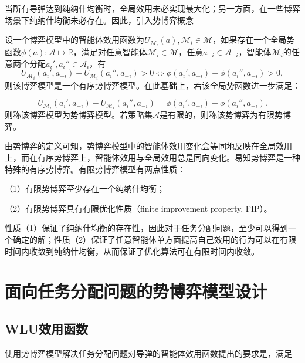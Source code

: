 当所有导弹达到纯纳什均衡时，全局效用未必实现最大化；另一方面，在一些博弈场景下纯纳什均衡未必存在。因此，引入势博弈概念

\begin{definition}[有序势博弈与势博弈]
\label{pg:def:potentialGame}
	设一个博弈模型中的智能体效用函数为$U_{\mathcal{M}_i}(a),\mathcal{M}_i\in \mathcal{M}$，如果存在一个全局势函数$\phi(a):\mathcal{A} \mapsto \mathbb{R}$，满足对任意智能体$\mathcal{M}_i \in \mathcal{M}$，任意$a_{-i}\in \mathcal{A}_{-i}$，智能体$\mathcal{M}_i$的任意两个分配$a_i',a_i''\in \mathcal{A}_i$，有
	\begin{equation}
	\label{pg:eq:ordpg}
		U_{\mathcal{M}_i}(a_i',a_{-i})-U_{\mathcal{M}_i}(a_i'',a_{-i})>0 \Leftrightarrow \phi(a_i',a_{-i})-\phi(a_i'',a_{-i})>0,
	\end{equation}
	则该博弈模型是一个有序势博弈模型。在此基础上，若该全局势函数进一步满足：
	
	\begin{equation}
	\label{pg:eq:pgdef}
		U_{\mathcal{M}_i}(a_i',a_{-i})-U_{\mathcal{M}_i}(a_i'',a_{-i})=\phi(a_i',a_{-i})-\phi(a_i'',a_{-i}).
	\end{equation}
	则称该博弈模型为势博弈模型。若策略集$\mathcal{A}$是有限的，则称该势博弈为有限势博弈。
\end{definition}

由势博弈的定义可知，势博弈模型中的智能体效用变化会等同地反映在全局效用上，而在有序势博弈上，智能体效用与全局效用总是同向变化。易知势博弈是一种特殊的有序势博弈。有限势博弈模型有两点性质：

（1）有限势博弈至少存在一个纯纳什均衡；

（2）有限势博弈具有有限优化性质（finite improvement property, FIP）。

性质（1）保证了纯纳什均衡的存在性，因此对于任务分配问题，至少可以得到一个确定的解；性质（2）保证了任意智能体单方面提高自己效用的行为可以在有限时间内收敛到纯纳什均衡，从而保证了优化算法可在有限时间内收敛。





\section{面向任务分配问题的势博弈模型设计}
\label{pg:agent_utility}

\subsection{WLU效用函数}
\label{pg:wlu}
使用势博弈模型解决任务分配问题对导弹的智能体效用函数提出的要求是，满足

